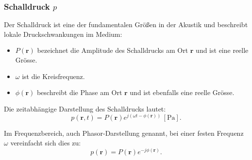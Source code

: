 \subsubsection{Schalldruck $p$}
% 
Der Schalldruck ist eine der fundamentalen Größen in der Akustik und beschreibt lokale Druckschwankungen im Medium:
 
\begin{itemize}
\item $P  (\boldsymbol{r})$ bezeichnet die Amplitude des Schalldrucks am Ort $\boldsymbol{r}$ und ist eine reelle Grösse.
%
\item $\omega$ ist die Kreisfrequenz.
%
\item $\phi  (\boldsymbol{r})$ beschreibt die Phase am Ort $\boldsymbol{r}$ und ist ebenfalls eine reelle Grösse.
\end{itemize}
 
Die zeitabhängige Darstellung des Schalldrucks lautet:
\begin{equation}
p(\boldsymbol{r},t)
=
P(\boldsymbol{r})  e^{j( \omega t - \phi(\boldsymbol{r}))}\, [\si{\pascal}].
\end{equation}
 
Im Frequenzbereich, auch Phasor-Darstellung genannt, bei einer festen
Frequenz $\omega$ vereinfacht sich dies zu:
\begin{equation}
p(\boldsymbol{r}) = P(\boldsymbol{r})  e^{-j \phi (\boldsymbol{r})}.
\label{helmholtz:PhasorSchalldruck}
\end{equation}
 
